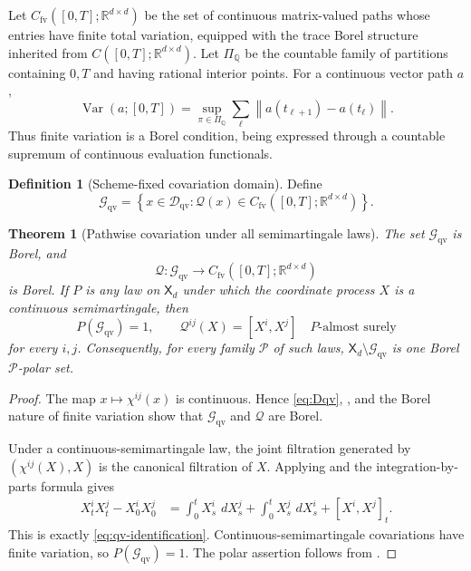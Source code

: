 \documentclass[11pt,reqno]{amsart}
\theoremstyle{plain}
\newtheorem{theorem}{Theorem}[section]
\theoremstyle{definition}
\newtheorem{definition}[definition]{Definition}
\newcommand{\R}{\mathbb R}
\newcommand{\cD}{\mathcal D}
\newcommand{\cG}{\mathcal G}
\newcommand{\cP}{\mathcal P}
\newcommand{\dd}{\,d}
\newcommand{\qv}{\mathcal Q}
\newcommand{\Var}{\operatorname{Var}}
\newcommand{\norm}[1]{\left\lVert #1\right\rVert}
\begin{document}
Let \(C_{\mathrm{fv}}([0,T];\R^{d\times d})\) be the set of continuous
matrix-valued paths whose entries have finite total variation, equipped with
the trace Borel structure inherited from
\(C([0,T];\R^{d\times d})\).  Let \(\Pi_{\mathbb Q}\) be the countable family
of partitions containing \(0,T\) and having rational interior points.  For a
continuous vector path \(a\),
\[
  \Var(a;[0,T])
  =
  \sup_{\pi\in\Pi_{\mathbb Q}}
  \sum_{\ell}
  \norm{a(t_{\ell+1})-a(t_\ell)}.
\]
Thus finite variation is a Borel condition, being expressed through a
countable supremum of continuous evaluation functionals.

\begin{definition}[Scheme-fixed covariation domain]
\label{def:Gqv}
Define
\begin{equation}\label{eq:Gqv}
  \cG_{\mathrm{qv}}
  =
  \left\{
    x\in\cD_{\mathrm{qv}}:
    \qv(x)\in C_{\mathrm{fv}}([0,T];\R^{d\times d})
  \right\}.
\end{equation}
\end{definition}

\begin{theorem}[Pathwise covariation under all semimartingale laws]
\label{thm:pathwise-qv}
The set \(\cG_{\mathrm{qv}}\) is Borel, and
\[
  \qv:\cG_{\mathrm{qv}}
  \longrightarrow C_{\mathrm{fv}}([0,T];\R^{d\times d})
\]
is Borel.  If \(P\) is any law on \(\mathsf X_d\) under which the coordinate
process \(X\) is a continuous semimartingale, then
\begin{equation}\label{eq:qv-identification}
  P(\cG_{\mathrm{qv}})=1,
  \qquad
  \qv^{ij}(X)=[X^i,X^j]
  \quad P\text{-almost surely}
\end{equation}
for every \(i,j\).  Consequently, for every family \(\cP\) of such laws,
\(\mathsf X_d\setminus\cG_{\mathrm{qv}}\) is one Borel
\(\cP\)-polar set.
\end{theorem}

\begin{proof}
The map \(x\mapsto\chi^{ij}(x)\) is continuous.  Hence
\eqref{eq:Dqv}, , and the Borel nature of finite
variation show that \(\cG_{\mathrm{qv}}\) and \(\qv\) are Borel.

Under a continuous-semimartingale law, the joint filtration generated by
\((\chi^{ij}(X),X)\) is the canonical filtration of \(X\).  Applying
 and the integration-by-parts formula
gives
\begin{align*}
  X_t^iX_t^j-X_0^iX_0^j
  &=
  \int_0^tX_s^i\,\dd X_s^j
  +
  \int_0^tX_s^j\,\dd X_s^i
  +
  [X^i,X^j]_t .
\end{align*}
This is exactly \eqref{eq:qv-identification}.  Continuous-semimartingale
covariations have finite variation, so \(P(\cG_{\mathrm{qv}})=1\).
The polar assertion follows from .
\end{proof}
\end{document}
